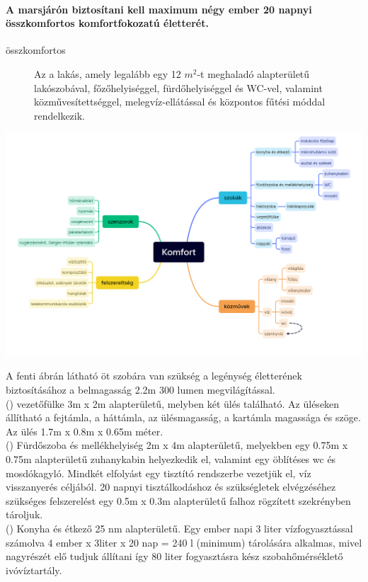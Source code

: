 \documentclass[12pt]{report}
\begin{document}
\paragraph{A marsjárón biztosítani kell maximum négy ember 20 napnyi összkomfortos komfortfokozatú életterét.}


\begin{description}
\item[összkomfortos] Az a lakás, amely legalább egy 12 $m^2$-t meghaladó alapterületű lakószobával, főzőhelyiséggel, fürdőhelyiséggel és WC-vel, valamint közművesítettséggel, melegvíz-ellátással és központos fűtési móddal rendelkezik. 
\end{description}

\includegraphics[scale=0.4]{images/komfort01.png}

A fenti ábrán látható öt szobára  van szükség a legénység életterének biztosításához a belmagasság 2.2m 300 lumen megvilágítással. \\() vezetőfülke 3m x 2m alapterületű, melyben két ülés található. Az üléseken állítható a fejtámla, a háttámla, az ülésmagasság, a kartámla magassága és szöge. Az ülés 1.7m x 0.8m x 0.65m méter. \\() Fürdőszoba és mellékhelyiség 2m x 4m alapterületű, melyekben egy 0.75m x 0.75m alapterületű zuhanykabin helyezkedik el, valamint egy öblítéses wc és mosdókagyló. Mindkét elfolyást egy tisztító rendszerbe vezetjük el, víz visszanyerés céljából. 20 napnyi tisztálkodáshoz és szükségletek elvégzéséhez szükséges felszerelést egy 0.5m x 0.3m alapterületű falhoz rögzített szekrényben tároljuk.  \\() Konyha és étkező 25 nm alapterületű. Egy ember napi 3 liter vízfogyasztással számolva 4 ember x 3liter x 20 nap = 240 l (minimum) tárolására alkalmas, mivel nagyrészét elő tudjuk állítani így 80 liter fogyasztásra kész szobahőmérséklető ivóvíztartály. 
\end{document}
